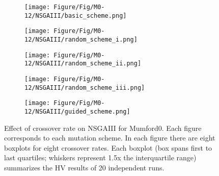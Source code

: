\begin{figure}[!htbp]
	\centering
	\begin{subfigure}[b]{0.52\textwidth}
		\texttt{[image: Figure/Fig/M0-12/NSGAIII/basic\_scheme.png]}
	\end{subfigure}%
	\begin{subfigure}[b]{0.52\textwidth}
		\texttt{[image: Figure/Fig/M0-12/NSGAIII/random\_scheme\_i.png]}
	\end{subfigure}%
	\newline
	\begin{subfigure}[b]{0.52\textwidth}
		\texttt{[image: Figure/Fig/M0-12/NSGAIII/random\_scheme\_ii.png]}
	\end{subfigure}%
	\begin{subfigure}[b]{0.52\textwidth}
		\texttt{[image: Figure/Fig/M0-12/NSGAIII/random\_scheme\_iii.png]}
	\end{subfigure}%
	\newline
	\begin{subfigure}[b]{0.52\textwidth}
		\texttt{[image: Figure/Fig/M0-12/NSGAIII/guided\_scheme.png]}
	\end{subfigure}%
	\caption{Effect of crossover rate on NSGAIII for Mumford0. Each figure corresponds to each mutation scheme. In each figure there are eight boxplots for eight crossover rates.  Each boxplot (box spans first to last quartiles; whiskers represent 1.5x the interquartile range) summarizes the HV results of 20 independent runs.}
	\label{fig:cr_m0_nsgaiii}
\end{figure}
